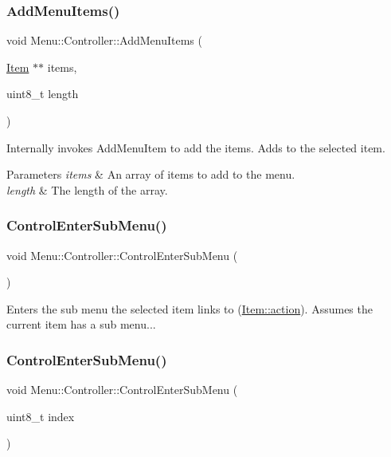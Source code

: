 \subsubsection{\texorpdfstring{Add\+Menu\+Items()}{AddMenuItems()}}
{\footnotesize\ttfamily void Menu\+::\+Controller\+::\+Add\+Menu\+Items (\begin{DoxyParamCaption}\item[{\hyperlink{struct_menu_1_1_item}{Item} $\ast$$\ast$}]{items,  }\item[{uint8\+\_\+t}]{length }\end{DoxyParamCaption})}

Internally invokes Add\+Menu\+Item to add the items. Adds to the selected item. 
\begin{DoxyParams}{Parameters}
{\em items} & An array of items to add to the menu. \\
\hline
{\em length} & The length of the array. \\
\hline
\end{DoxyParams}
\hypertarget{class_menu_1_1_controller_a9a4c0ccd822f485834ec9abb4133a059}{}\label{class_menu_1_1_controller_a9a4c0ccd822f485834ec9abb4133a059} 
\subsubsection{\texorpdfstring{Control\+Enter\+Sub\+Menu()}{ControlEnterSubMenu()}\hspace{0.1cm}{\footnotesize\ttfamily [1/2]}}
{\footnotesize\ttfamily void Menu\+::\+Controller\+::\+Control\+Enter\+Sub\+Menu (\begin{DoxyParamCaption}{ }\end{DoxyParamCaption})}

Enters the sub menu the selected item links to (\hyperlink{struct_menu_1_1_item_a247e140fed2addf80986ba5a3506b9dd}{Item\+::action}). Assumes the current item has a sub menu... \hypertarget{class_menu_1_1_controller_a8bc1d62574e86a08d5a60652370dd21a}{}\label{class_menu_1_1_controller_a8bc1d62574e86a08d5a60652370dd21a} 
\subsubsection{\texorpdfstring{Control\+Enter\+Sub\+Menu()}{ControlEnterSubMenu()}\hspace{0.1cm}{\footnotesize\ttfamily [2/2]}}
{\footnotesize\ttfamily void Menu\+::\+Controller\+::\+Control\+Enter\+Sub\+Menu (\begin{DoxyParamCaption}\item[{uint8\+\_\+t}]{index }\end{DoxyParamCaption})}

